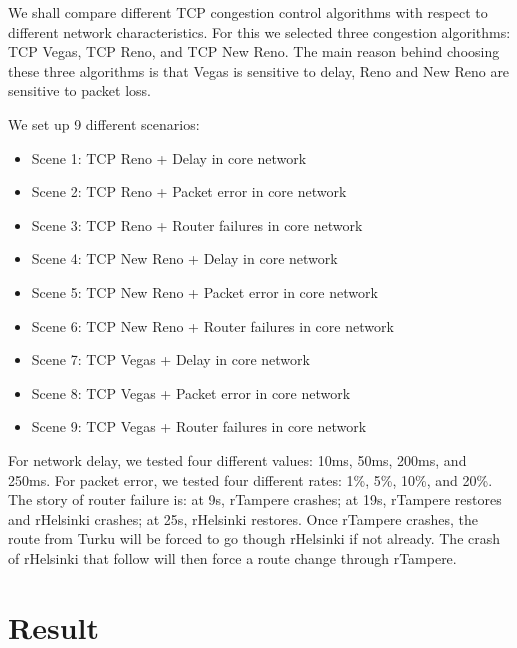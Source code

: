 \documentclass[conference,a4paper]{../../sty/IEEEtran}
\begin{document}
We shall compare different TCP congestion control algorithms with respect to different network characteristics.
For this we selected three congestion algorithms: TCP Vegas, TCP Reno, and TCP New Reno.
The main reason behind choosing these three algorithms is that Vegas is sensitive to delay, Reno and New Reno are sensitive to packet loss.

We set up 9 different scenarios:
\begin{itemize}
\item Scene 1: TCP Reno + Delay in core network
\item Scene 2: TCP Reno + Packet error in core network
\item Scene 3: TCP Reno + Router failures in core network
\item Scene 4: TCP New Reno + Delay in core network
\item Scene 5: TCP New Reno + Packet error in core network
\item Scene 6: TCP New Reno + Router failures in core network
\item Scene 7: TCP Vegas + Delay in core network
\item Scene 8: TCP Vegas + Packet error in core network
\item Scene 9: TCP Vegas + Router failures in core network
\end{itemize}

For network delay, we tested four different values: 10ms, 50ms, 200ms, and 250ms.
For packet error, we tested four different rates: 1\%, 5\%, 10\%, and 20\%.
The story of router failure is: at 9s, rTampere crashes; at 19s, rTampere restores and rHelsinki crashes; at 25s, rHelsinki restores.
Once rTampere crashes, the route from Turku will be forced to go though rHelsinki if not already.
The crash of rHelsinki that follow will then force a route change through rTampere.


\section{Result}

\end{document}

